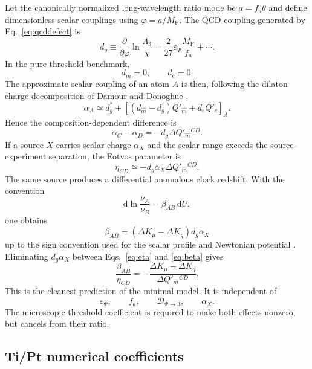 \documentclass[11pt,a4paper]{article}
\newcommand{\dd}{\mathrm{d}}
\newcommand{\MP}{M_{\mathrm P}}
\begin{document}
Let the canonically normalized long-wavelength ratio mode be $a=f_a\theta$ and define dimensionless scalar couplings using $\varphi=a/\MP$. The QCD coupling generated by Eq.~\eqref{eq:qcddefect} is
\[
\boxed{
 d_g
\equiv
\frac{\partial}{\partial\varphi}
\ln\frac{\Lambda_3}{\chi}
=\frac{2}{27}\varepsilon_\Psi\frac{\MP}{f_a}+\cdots.
}
\label{eq:dg}
\]
In the pure threshold benchmark,
\[
d_{\widehat m}=0,
\qquad
d_e=0.
\]
The approximate scalar coupling of an atom $A$ is then, following the dilaton-charge decomposition of Damour and Donoghue \cite{DamourDonoghue2010},
\[
\alpha_A
\simeq d_g^*
+\left[(d_{\widehat m}-d_g)Q'_{\widehat m}+d_eQ'_e\right]_A.
\label{eq:atomcharge}
\]
Hence the composition-dependent difference is
\[
\boxed{
\alpha_C-\alpha_D
=-d_g\Delta Q'_{\widehat m}{}^{CD}.
}
\label{eq:chargedifference}
\]
If a source $X$ carries scalar charge $\alpha_X$ and the scalar range exceeds the source--experiment separation, the Eotvos parameter is
\[
\boxed{
\eta_{CD}
\simeq -d_g\alpha_X\Delta Q'_{\widehat m}{}^{CD}.
}
\label{eq:eta}
\]
The same source produces a differential anomalous clock redshift. With the convention
\[
\dd\ln\frac{\nu_A}{\nu_B}
=\beta_{AB}\,\dd U,
\]
one obtains
\[
\boxed{
\beta_{AB}
=(\Delta K_\mu-\Delta K_q)d_g\alpha_X
}
\label{eq:beta}
\]
up to the sign convention used for the scalar profile and Newtonian potential \cite{Brzeminski2022}. Eliminating $d_g\alpha_X$ between Eqs.~\eqref{eq:eta} and \eqref{eq:beta} gives
\[
\boxed{
\frac{\beta_{AB}}{\eta_{CD}}
=-\frac{\Delta K_\mu-\Delta K_q}
{\Delta Q'_{\widehat m}{}^{CD}}.
}
\label{eq:masterratio}
\]
This is the cleanest prediction of the minimal model. It is independent of
\[
\varepsilon_\Psi,
\qquad
f_a,
\qquad
\mathcal D_{\Psi\to3},
\qquad
\alpha_X.
\]
The microscopic threshold coefficient is required to make both effects nonzero, but cancels from their ratio.

\subsection{Ti/Pt numerical coefficients}
\end{document}
